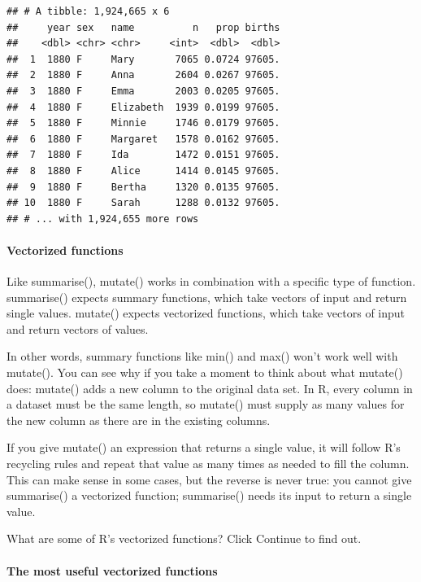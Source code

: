 \documentclass[
]{article}
\begin{document}
\begin{verbatim}
## # A tibble: 1,924,665 x 6
##     year sex   name          n   prop births
##    <dbl> <chr> <chr>     <int>  <dbl>  <dbl>
##  1  1880 F     Mary       7065 0.0724 97605.
##  2  1880 F     Anna       2604 0.0267 97605.
##  3  1880 F     Emma       2003 0.0205 97605.
##  4  1880 F     Elizabeth  1939 0.0199 97605.
##  5  1880 F     Minnie     1746 0.0179 97605.
##  6  1880 F     Margaret   1578 0.0162 97605.
##  7  1880 F     Ida        1472 0.0151 97605.
##  8  1880 F     Alice      1414 0.0145 97605.
##  9  1880 F     Bertha     1320 0.0135 97605.
## 10  1880 F     Sarah      1288 0.0132 97605.
## # ... with 1,924,655 more rows
\end{verbatim}

\hypertarget{vectorized-functions}{%
\paragraph{Vectorized functions}\label{vectorized-functions}}

Like summarise(), mutate() works in combination with a specific type of
function. summarise() expects summary functions, which take vectors of
input and return single values. mutate() expects vectorized functions,
which take vectors of input and return vectors of values.

In other words, summary functions like min() and max() won't work well
with mutate(). You can see why if you take a moment to think about what
mutate() does: mutate() adds a new column to the original data set. In
R, every column in a dataset must be the same length, so mutate() must
supply as many values for the new column as there are in the existing
columns.

If you give mutate() an expression that returns a single value, it will
follow R's recycling rules and repeat that value as many times as needed
to fill the column. This can make sense in some cases, but the reverse
is never true: you cannot give summarise() a vectorized function;
summarise() needs its input to return a single value.

What are some of R's vectorized functions? Click Continue to find out.

\hypertarget{the-most-useful-vectorized-functions}{%
\paragraph{The most useful vectorized
functions}\label{the-most-useful-vectorized-functions}}
\end{document}
